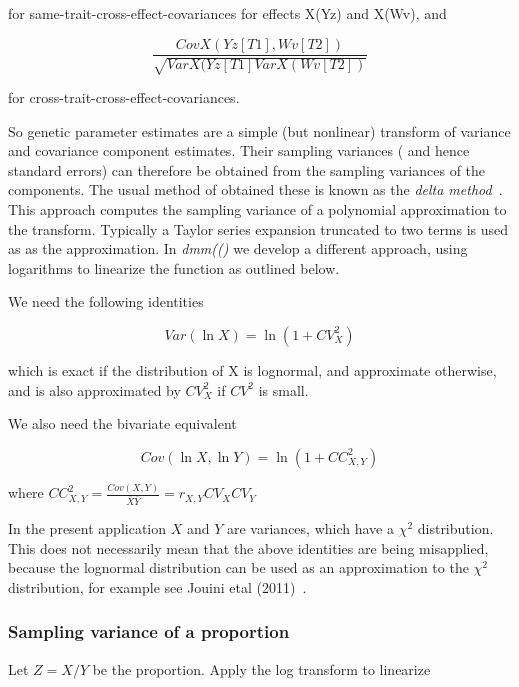 \documentclass[titlepage]{article}  %
\begin{document}
for same-trait-cross-effect-covariances for effects X(Yz) and X(Wv), and

\begin{displaymath}
\frac{CovX(Yz[T1],Wv[T2])}{\sqrt{VarX(Yz[T1] VarX(Wv[T2])}}
\end{displaymath}

for cross-trait-cross-effect-covariances.

So genetic parameter estimates are a simple (but nonlinear) transform of variance and covariance component estimates.  Their sampling variances ( and hence standard errors) can therefore be obtained from the sampling variances of the components. The usual method of obtained these is known as the {\em delta method}~\cite{anon:14}. This approach computes the sampling variance of a polynomial approximation to the transform. Typically a Taylor series expansion truncated to two terms is used as as the approximation. In {\em dmm(()} we develop a different approach, using logarithms to linearize the function as outlined below.

 We need the following identities

\begin{displaymath}
Var(\ln X) = \ln(1 + CV^{2}_{X})
\end{displaymath}

which is exact if the distribution of X is lognormal, and approximate otherwise, and is also approximated by $CV^{2}_{X}$ if $CV^{2}$ is small.

We also need the bivariate equivalent

\begin{displaymath}
Cov(\ln X, \ln Y) = \ln(1 + CC^{2}_{X,Y})
\end{displaymath}

where $ CC^{2}_{X,Y} = \frac{Cov(X,Y)}{\overline{X}\overline{Y}} = r_{X,Y}CV_{X}CV_{Y}$

In the present application $X$ and $Y$ are variances, which have a $\chi^{2}$ distribution. This does not necessarily mean that the above identities are being misapplied, because the lognormal distribution can be used as an approximation to the $\chi^{2}$ distribution, for example see Jouini etal (2011)~\cite{joui:11}.

\subsubsection{Sampling variance of a proportion}

Let $Z = X/Y$ be the proportion. Apply the log transform to linearize
\end{document}
